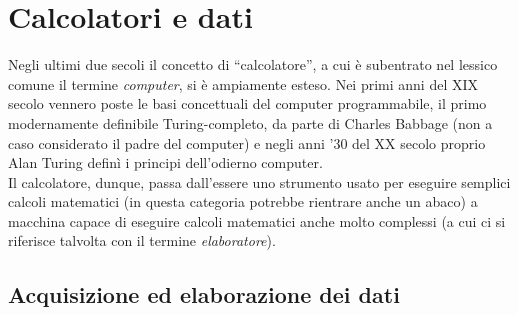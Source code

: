 
\chapter{Calcolatori e dati} %

\label{Chapter2} %


Negli ultimi due secoli il concetto di ``calcolatore'', a cui è subentrato nel
lessico comune il termine \emph{computer}, si è ampiamente esteso. Nei primi
anni del XIX secolo vennero poste le basi concettuali del computer programmabile, 
il primo modernamente definibile Turing-completo, da parte di Charles Babbage 
(non a caso considerato il padre del computer\citep{CBabbage})
e negli anni '30 del XX secolo proprio Alan Turing definì i principi 
dell'odierno computer. 
\\
Il calcolatore, dunque, passa dall'essere uno strumento usato per
eseguire semplici calcoli matematici (in questa categoria potrebbe rientrare
anche un abaco) a macchina capace di eseguire calcoli matematici anche molto 
complessi (a cui ci si riferisce talvolta con il termine \emph{elaboratore}).

\section{Acquisizione ed elaborazione dei dati}

